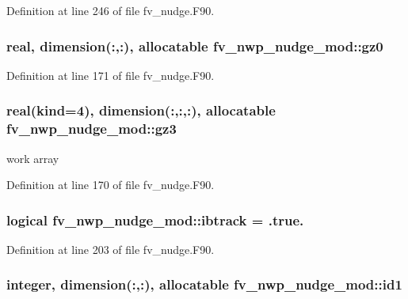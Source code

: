 Definition at line 246 of file fv\-\_\-nudge.\-F90.

\subsubsection[{gz0}]{\setlength{\rightskip}{0pt plus 5cm}real, dimension(\-:,\-:), allocatable fv\-\_\-nwp\-\_\-nudge\-\_\-mod\-::gz0\hspace{0.3cm}{\ttfamily [private]}}\label{classfv__nwp__nudge__mod_adb43d826a6835d384402078dd0280d5b}


Definition at line 171 of file fv\-\_\-nudge.\-F90.

\subsubsection[{gz3}]{\setlength{\rightskip}{0pt plus 5cm}real(kind=4), dimension(\-:,\-:,\-:), allocatable fv\-\_\-nwp\-\_\-nudge\-\_\-mod\-::gz3\hspace{0.3cm}{\ttfamily [private]}}\label{classfv__nwp__nudge__mod_a732a8eaade4984925290ea5b5372a8fe}


work array 



Definition at line 170 of file fv\-\_\-nudge.\-F90.

\subsubsection[{ibtrack}]{\setlength{\rightskip}{0pt plus 5cm}logical fv\-\_\-nwp\-\_\-nudge\-\_\-mod\-::ibtrack = .true.\hspace{0.3cm}{\ttfamily [private]}}\label{classfv__nwp__nudge__mod_a095af635f02f1f236a662ea553ed82ed}


Definition at line 203 of file fv\-\_\-nudge.\-F90.

\subsubsection[{id1}]{\setlength{\rightskip}{0pt plus 5cm}integer, dimension(\-:,\-:), allocatable fv\-\_\-nwp\-\_\-nudge\-\_\-mod\-::id1\hspace{0.3cm}{\ttfamily [private]}}\label{classfv__nwp__nudge__mod_a355d223578b7728e289a6631c18206bb}



